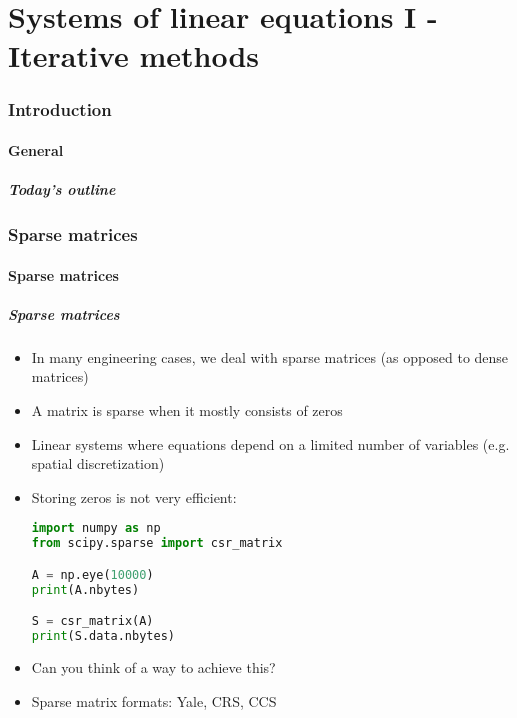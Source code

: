 \part{Systems of linear equations I - Iterative methods}
\section{Introduction}
\subsection*{General}
\begin{frame}[label=contents_lin3]
  \frametitle{Today's outline}
\end{frame}

\section{Sparse matrices}
\subsection*{Sparse matrices}

\begin{frame}[fragile]
  \frametitle{Sparse matrices}
  \begin{itemize}
    \item In many engineering cases, we deal with sparse matrices (as opposed to dense matrices)
    \item A matrix is sparse when it mostly consists of zeros
    \item Linear systems where equations depend on a limited number of variables (e.g. spatial discretization)
    \item Storing zeros is not very efficient:
    \begin{lstlisting}[language=Python]
import numpy as np
from scipy.sparse import csr_matrix

A = np.eye(10000)
print(A.nbytes)

S = csr_matrix(A)
print(S.data.nbytes)      
    \end{lstlisting}
    \item Can you think of a way to achieve this?
    \item Sparse matrix formats: Yale, CRS, CCS
\end{itemize}
\end{frame}

